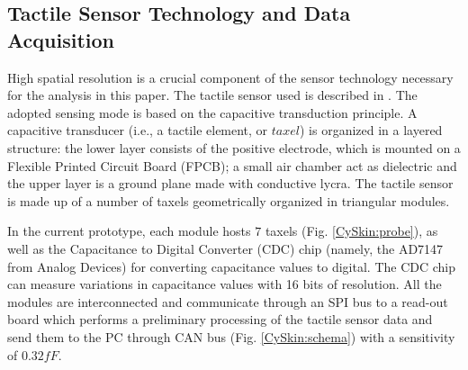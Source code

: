 \documentclass[]{interact}
\theoremstyle{plain}%
\theoremstyle{definition}
\theoremstyle{remark}
\begin{document}
\subsection{Tactile Sensor Technology and Data Acquisition} \label{sec_skin}

High spatial resolution is a crucial component of the sensor technology necessary for the 
analysis in this paper. The tactile sensor used is described in \cite{schmitz_methods_2011}. 
The adopted sensing mode is based on the capacitive transduction principle. 
A capacitive transducer (i.e., a tactile element, or $taxel$) is organized in a 
layered structure: the lower layer consists of the positive electrode, which is mounted 
on a Flexible Printed Circuit Board (FPCB); a small air chamber act as dielectric and the 
upper layer is a ground plane made with conductive lycra. The tactile sensor is made up 
of a number of taxels geometrically organized in triangular modules. 

In the current prototype, each module hosts $7$ taxels (Fig. \ref{CySkin:probe}), as well as 
the Capacitance to Digital Converter (CDC) chip (namely, the AD7147 from Analog Devices) for 
converting capacitance values to digital. The CDC chip can measure variations in capacitance 
values with 16 bits of resolution. All the modules are interconnected and communicate through 
an SPI bus to a read-out board which performs a preliminary processing of the tactile sensor 
data and send them to the PC through CAN bus (Fig. \ref{CySkin:schema}) %
with a sensitivity of $0.32fF$. 
\end{document}

